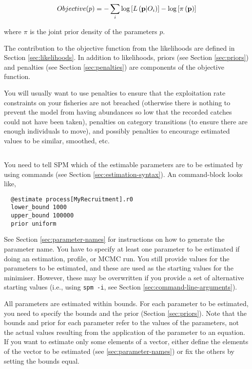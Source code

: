\begin{equation}
Objective(p)= - \sum\limits_i {\log \left[ {L\left( {{\bf{p}}|O_i } \right)} \right]}  - \log \left[ {\pi \left( {\bf{p}} \right)} \right]
\end{equation}

where $\pi$ is the joint prior density of the parameters $p$.

The contribution to the objective function from the likelihoods are defined in Section \ref{sec:likelihoods}. In addition to likelihoods, priors (see Section \ref{sec:priors}) and penalties (see Section \ref{sec:penalties}) are components of the objective function. 

You will usually want to use penalties to ensure that the exploitation rate constraints on your fisheries are not breached (otherwise there is nothing to prevent the model from having abundances so low that the recorded catches could not have been taken), penalties on category transitions (to ensure there are enough individuals to move), and possibly penalties to encourage estimated values to be similar, smoothed, etc.

\subsection{\label{sec:estimate-free-parameters}}

You need to tell SPM which of the estimable parameters are to be estimated by using  commands (see Section \ref{sec:estimation-syntax}). An  command-block looks like,

\begin{verbatim}
  @estimate process[MyRecruitment].r0
  lower_bound 1000
  upper_bound 100000
  prior uniform
\end{verbatim}

See Section \ref{sec:parameter-names} for instructions on how to generate the parameter name. You have to specify at least one parameter to be estimated if doing an estimation, profile, or MCMC run. You still provide values for the parameters to be estimated, and these are used as the starting values for the minimiser. However, these may be overwritten if you provide a set of alternative starting values (i.e., using  \texttt{spm -i}, see Section \ref{sec:command-line-arguments}).

All parameters are estimated within bounds. For each parameter to be estimated, you need to specify the bounds and the prior (Section \ref{sec:priors}). Note that the bounds and prior for each parameter refer to the values of the parameters, not the actual values resulting from the application of the parameter to an equation. If you want to estimate only some elements of a vector, either define the elements of the vector to be estimated (see \ref{sec:parameter-names}) or fix the others by setting the bounds equal.


